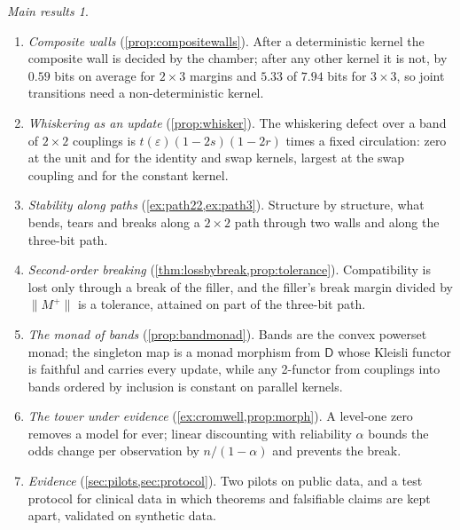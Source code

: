 \documentclass[11pt]{article}
\theoremstyle{definition}
\theoremstyle{remark}
\newtheorem*{mainthm}{Main results}
\newcommand{\D}{\mathsf{D}}
\begin{document}
\begin{mainthm}
\begin{enumerate}[label=(\Alph*),leftmargin=*]
  a polytope whose upper entropy is the sum of the margins' upper entropies; cones are compatible laws; breaking is created only by
  conditioning, Jeffrey updates with a zero target and kernels with a zero column, and removed by kernels with positive entries.
\item \emph{Composite walls} (\cref{prop:compositewalls}). After a deterministic kernel the composite wall is decided by the chamber; after any
  other kernel it is not, by $0.59$ bits on average for $2\times3$ margins and $5.33$ of $7.94$ bits for $3\times3$, so joint transitions need a
  non-deterministic kernel.
\item \emph{Whiskering as an update} (\cref{prop:whisker}). The whiskering defect over a band of $2\times2$ couplings is
  $t(\varepsilon)(1-2s)(1-2r)$ times a fixed circulation: zero at the unit and for the identity and swap kernels, largest at the swap
  coupling and for the constant kernel.
\item \emph{Stability along paths} (\cref{ex:path22,ex:path3}). Structure by structure, what bends, tears and breaks along a $2\times2$ path
  through two walls and along the three-bit path.
\item \emph{Second-order breaking} (\cref{thm:lossbybreak,prop:tolerance}). Compatibility is lost only through a break of the filler,
  and the filler's break margin divided by $\lVert M^+\rVert$ is a tolerance, attained on part of the three-bit path.
\item \emph{The monad of bands} (\cref{prop:bandmonad}). Bands are the convex powerset monad; the singleton map is a monad morphism from
  $\D$ whose Kleisli functor is faithful and carries every update, while any 2-functor from couplings into bands ordered by inclusion is
  constant on parallel kernels.
\item \emph{The tower under evidence} (\cref{ex:cromwell,prop:morph}). A level-one zero removes a model for ever; linear discounting with reliability $\alpha$
  bounds the odds change per observation by $n/(1-\alpha)$ and prevents the break.
\item \emph{Evidence} (\cref{sec:pilots,sec:protocol}). Two pilots on public data, and a test protocol for clinical
  data in which theorems and falsifiable claims are kept apart, validated on synthetic data.
\end{enumerate}
\end{mainthm}
\end{document}
